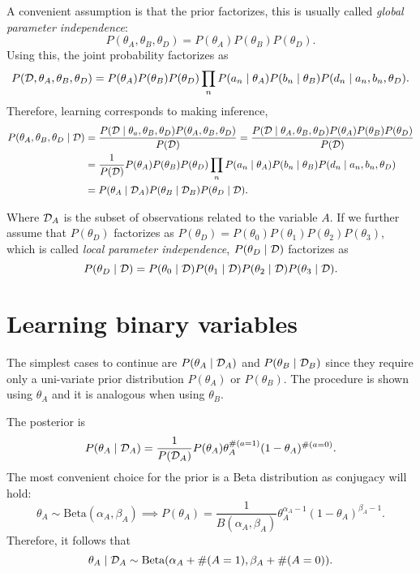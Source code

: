 A convenient assumption is that the prior factorizes, this is usually called
\emph{global parameter independence}:
\[
  P(\theta_{A}, \theta_{B}, \theta_{D}) = P(\theta_{A})P(\theta_{B})P(\theta_{D}).
\]
Using this, the joint probability factorizes as
\[
  P(\mathcal{D}, \theta_{A}, \theta_{B}, \theta_{D}) = P(\theta_{A})P(\theta_{B})P(\theta_{D})\prod_{n}P(a_{n}\mid \theta_{A})P(b_{n} \mid \theta_{B})P(d_{n}\mid a_{n}, b_{n}, \theta_{D}).
\]
Therefore, learning corresponds to making inference,
\[
  \begin{aligned}
    P(\theta_{A}, \theta_{B}, \theta_{D}\mid \mathcal{D}) 
    &= \frac{P(\mathcal{D} \mid \theta_{a}, \theta_{B}, \theta_{D})P(\theta_{A}, \theta_{B}, \theta_{D})}{P(\mathcal{D})} =\frac{P(\mathcal{D} \mid \theta_{A}, \theta_{B}, \theta_{D})P(\theta_{A}) P(\theta_{B})P( \theta_{D})}{P(\mathcal{D})}\\
    &= \frac{1}{P(\mathcal{D})}P(\theta_{A})P(\theta_{B})P(\theta_{D})\prod_{n}P(a_{n}\mid \theta_{A})P(b_{n}\mid \theta_{B})P(d_{n}\mid a_{n}, b_{n},\theta_{D})\\
    &= P(\theta_{A} \mid \mathcal{D}_{A} )P(\theta_{B}\mid \mathcal{D}_{B})P(\theta_{D} \mid \mathcal{D}).
  \end{aligned}
\]

Where \(\mathcal{D}_{A}\) is the subset of observations related to the variable \(A\). If we further assume that \(P(\theta_{D})\) factorizes as
\(P(\theta_{D}) = P(\theta_{0})P(\theta_{1})P(\theta_{2})P(\theta_{3})\),
which is called \emph{local parameter independence}, \(P(\theta_{D} \mid \mathcal{D})\) factorizes as
\[
  P(\theta_{D}\mid \mathcal{D}) = P(\theta_{0} \mid \mathcal{D} )P(\theta_{1} \mid \mathcal{D} )P(\theta_{2} \mid \mathcal{D} )P(\theta_{3} \mid \mathcal{D} ).
\]

\section{Learning binary variables}

The simplest cases to continue are \(P(\theta_{A} \mid \mathcal{D}_{A})\) and
\(P(\theta_{B} \mid \mathcal{D}_{B})\) since they require only a uni-variate prior distribution
\(P(\theta_{A})\) or \(P(\theta_{B})\). The procedure is shown using \( \theta_A \) and it is analogous when using \( \theta_B \). 

The posterior is
\[
  P(\theta_{A} \mid \mathcal{D}_{A}) = \frac{1}{P(\mathcal{D}_{A})}P(\theta_{A})\theta_{A}^{\#(a=1)}(1-\theta_{A})^{\#(a=0)}.
\]
The most convenient choice for the prior is a Beta distribution as conjugacy
will hold:
\[
  \theta_{A} \sim \text{Beta}(\alpha_{A}, \beta_{A}) \implies P(\theta_{A})  = \frac{1}{B(\alpha_{A}, \beta_{A})}\theta_{A}^{\alpha_{A}-1}(1-\theta_{A})^{\beta_{A} - 1}.
\]
Therefore, it follows that
\[
  \theta_{A} \mid \mathcal{D}_{A} \sim \text{Beta}(\alpha_{A} + \#(A=1), \beta_{A} + \#(A = 0)).
\]

